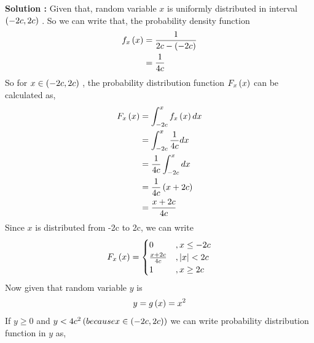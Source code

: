 \documentclass[journal,12pt,twocolumn]{IEEEtran}
\begin{document}
\textbf{Solution :} Given that, random variable $x$ is uniformly distributed in interval $\left(-2c,2c\right)$ . So we can write that, the probability density function 
               \begin{align}
                        f_{x}\left(x\right) &= \frac{1}{2c - \left(-2c\right)}\\
                                            &= \frac{1}{4c}
               \end{align}
       So for $ x \in \left(-2c,2c\right) $ , the probability distribution function $F_{x}\left(x\right)$ can be calculated as,
               \begin{align}
                           F_{x}\left(x\right) &= \int_{-2c}^{x} f_x\left(x\right)dx\\
                                                &= \int_{-2c}^{x} \frac{1}{4c}dx\\
                                                &= \frac{1}{4c}\int_{-2c}^{x}dx\\
                                                &= \frac{1}{4c}\left(x + 2c\right)\\
                                                &= \frac{x+2c}{4c}
                \end{align}
            Since $x$ is distributed from -2c to 2c, we can write
                 \begin{equation*}
                                 F_{x}\left(x\right) = \begin{cases}
                                                          0  &, x \leq -2c \\
                                                         \frac{x+2c}{4c} &, \left\vert x\right\vert < 2c \\
                                                         1  & , x \geq 2c
                                                        \end{cases}
                 \end{equation*}
            Now given that random variable $y$ is
                      \begin{align}
                                 y = g\left(x\right)= x^2
                       \end{align}                                 
               If $ y \geq 0 $ and $ y < 4c^2 \left(because x \in \left(-2c,2c\right)\right)$ we can write probability distribution function in $y$ as,
\end{document}
